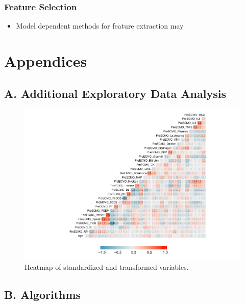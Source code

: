 \documentclass[12pt,]{article}
\providecommand{\tightlist}{%
  \setlength{\itemsep}{0pt}\setlength{\parskip}{0pt}}
\begin{document}
\subsubsection{Feature Selection}\label{feature-selection-2}

\begin{itemize}
\tightlist
\item
  Model dependent methods for feature extraction may
\end{itemize}

\newpage

\section{Appendices}\label{appendices}

\subsection{A. Additional Exploratory Data
Analysis}\label{a.-additional-exploratory-data-analysis}

\begin{figure}[H]

{\centering \includegraphics[width=1\linewidth]{figure/graphics-unnamed-chunk-13-1} 

}

\caption{\label{fig:heatmap-standardized}Heatmap of standardized and transformed variables.}\label{fig:unnamed-chunk-13}
\end{figure}

\subsection{B. Algorithms}\label{b.-algorithms}
\end{document}
